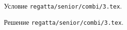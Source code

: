 Условие \texttt{regatta/senior/combi/3.tex}.

\solution Решение \texttt{regatta/senior/combi/3.tex}.
